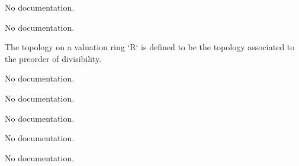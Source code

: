 \begin{theorem}\label{Valuation.ltIdeal_eq_top}
                No documentation.
    \end{theorem}

\begin{theorem}\label{DiscreteValuation.leIdeal_eq_ltIdeal_add_one}
                No documentation.
    \end{theorem}

\begin{definition}\label{ValuationTopology.ValuationRing.setoid}
                The topology on a valuation ring `R` is defined to be the topology associated to the preorder of divisibility.
    \end{definition}

\begin{definition}\label{ValuationTopology.ValuationRing.ValueMonoid}
                No documentation.
    \end{definition}

\begin{definition}\label{CompleteDiscreteValuationRing}
        \leanok
                No documentation.
    \end{definition}

\begin{definition}\label{CompleteValuationField}
        \leanok
                No documentation.
    \end{definition}

\begin{definition}\label{CompleteDiscreteValuationField}
        \leanok
                No documentation.
    \end{definition}

\begin{theorem}\label{lowerindex_ge_iff_lowerramificationGroup}
                No documentation.
    \end{theorem}

